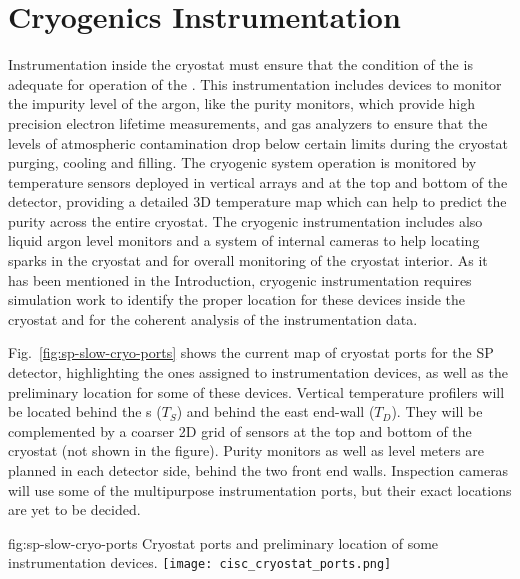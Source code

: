 \section{Cryogenics Instrumentation}
\label{sec:fdsp-cryo-instr} %
\label{sec:fddp-cryo-instr} %
\label{sec:fdgen-cryo-instr} %

Instrumentation inside the cryostat must ensure that the condition of the  is adequate for operation of the .
This instrumentation includes devices to monitor the impurity level of the argon, like the purity monitors, which provide high precision electron lifetime measurements,
and gas analyzers to ensure that the levels of atmospheric contamination drop below certain limits during the cryostat purging, cooling and filling.
The cryogenic system operation is monitored by temperature sensors deployed in vertical arrays and at the top and bottom of the detector, providing a 
detailed 3D temperature map which can help to predict the  purity across the entire cryostat. The cryogenic instrumentation includes also liquid argon level monitors and
a system of internal cameras to help locating sparks in the cryostat and for overall monitoring of the cryostat interior. 
As it has been mentioned in the Introduction, cryogenic instrumentation requires simulation work to identify the proper location for these devices inside the cryostat and
for the coherent analysis of the instrumentation data. 

Fig.~\ref{fig:sp-slow-cryo-ports} shows the current map of cryostat ports for the SP detector, highlighting the ones assigned to instrumentation devices,
as well as the preliminary location for some of these devices. Vertical temperature profilers will be located behind the s ($T_S$) and behind the east end-wall ($T_D$).
They will be complemented by a coarser 2D grid of sensors at the top and bottom of the cryostat (not shown in the figure). Purity monitors as well as level meters are planned
in each detector side, behind the two front end walls. Inspection cameras will use some of the multipurpose instrumentation ports, but their exact locations are yet to be decided. 

\begin{dunefigure}{fig:sp-slow-cryo-ports}
{Cryostat ports and preliminary location of some instrumentation devices. }
\texttt{[image: cisc\_cryostat\_ports.png]}
\end{dunefigure}




